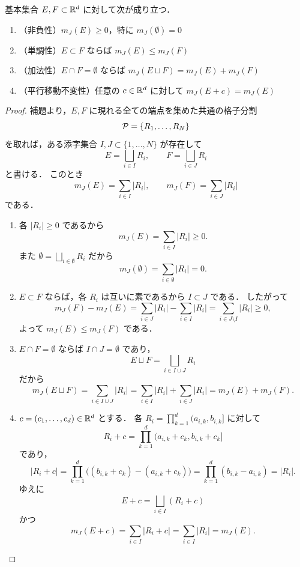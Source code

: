 \begin{theorem}[基本集合の測度の性質]
基本集合 $E,F \subset \mathbb R^d$ に対して次が成り立つ．
\begin{enumerate}
    \item （非負性）$m_J(E) \ge 0$，特に $m_J(\emptyset)=0$
    \item （単調性）$E \subset F$ ならば $m_J(E) \le m_J(F)$
    \item （加法性）$E \cap F = \emptyset$ ならば $m_J(E \sqcup F) = m_J(E) + m_J(F)$
    \item （平行移動不変性）任意の $c \in \mathbb R^d$ に対して $m_J(E+c) = m_J(E)$
\end{enumerate}
\end{theorem}
\begin{proof}
補題より，$E,F$ に現れる全ての端点を集めた共通の格子分割
\[
\mathcal P=\{R_1,\dots,R_N\}
\]
を取れば，ある添字集合 $I,J \subset \{1,\dots,N\}$ が存在して
\[
E=\bigsqcup_{i\in I} R_i,
\qquad
F=\bigsqcup_{i\in J} R_i
\]
と書ける．
このとき
\[
m_J(E)=\sum_{i\in I}|R_i|,
\qquad
m_J(F)=\sum_{i\in J}|R_i|
\]
である．

\begin{enumerate}
    \item 各 $|R_i| \ge 0$ であるから
    \[
    m_J(E)=\sum_{i\in I}|R_i| \ge 0.
    \]
    また $\emptyset=\bigsqcup_{i\in\emptyset}R_i$ だから
    \[
    m_J(\emptyset)=\sum_{i\in\emptyset}|R_i|=0.
    \]

    \item $E \subset F$ ならば，各 $R_i$ は互いに素であるから $I \subset J$ である．
    したがって
    \[
    m_J(F)-m_J(E)
    =\sum_{i\in J}|R_i|-\sum_{i\in I}|R_i|
    =\sum_{i\in J\setminus I}|R_i|
    \ge 0,
    \]
    よって $m_J(E)\le m_J(F)$ である．

    \item $E \cap F=\emptyset$ ならば $I\cap J=\emptyset$ であり，
    \[
    E\sqcup F=\bigsqcup_{i\in I\cup J}R_i
    \]
    だから
    \[
    m_J(E\sqcup F)
    =\sum_{i\in I\cup J}|R_i|
    =\sum_{i\in I}|R_i|+\sum_{i\in J}|R_i|
    =m_J(E)+m_J(F).
    \]

    \item $c=(c_1,\dots,c_d)\in\mathbb R^d$ とする．
    各 $R_i=\prod_{k=1}^d(a_{i,k},b_{i,k}]$ に対して
    \[
    R_i+c=\prod_{k=1}^d(a_{i,k}+c_k,b_{i,k}+c_k]
    \]
    であり，
    \[
    |R_i+c|
    =\prod_{k=1}^d\bigl((b_{i,k}+c_k)-(a_{i,k}+c_k)\bigr)
    =\prod_{k=1}^d(b_{i,k}-a_{i,k})
    =|R_i|.
    \]
    ゆえに
    \[
    E+c=\bigsqcup_{i\in I}(R_i+c)
    \]
    かつ
    \[
    m_J(E+c)
    =\sum_{i\in I}|R_i+c|
    =\sum_{i\in I}|R_i|
    =m_J(E).
    \]
\end{enumerate}
\end{proof}

